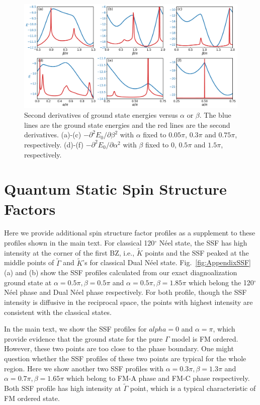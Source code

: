 \documentclass[aps,prb,reprint,amsfonts,amsmath,amssymb,showpacs,groupedaddress,superscriptaddress]{revtex4-1}
\begin{document}
\begin{figure}
    \centering
    \includegraphics[width=\columnwidth]{fig/SecondDerivatives.pdf}
    \caption{\label{fig:SecondDerivatives}Second derivatives of ground state energies versus $\alpha$ or $\beta$. The blue lines are the ground state energies and the red lines are the second derivatives. (a)-(c) $-\partial^2E_0/\partial\beta^2$ with $\alpha$ fixed to $0.05\pi$, $0.3\pi$ and $0.75\pi$, respectively. (d)-(f) $-\partial^2E_0/\partial\alpha^2$ with $\beta$ fixed to $0$, $0.5\pi$ and $1.5\pi$, respectively.}
\end{figure}

\section{\label{apx:SSF}Quantum Static Spin Structure Factors}

Here we provide additional spin structure factor profiles as a supplement to these profiles shown in the main text. For classical 120$^\circ$ N\'{e}el state, the SSF has high intensity at the corner of the first BZ, i.e., $\tilde{K}$ points and the SSF peaked at the middle points of $\tilde{\Gamma}$ and $\tilde{K}$'s for classical Dual N\'{e}el state. Fig.~\ref{fig:AppendixSSF}(a) and (b) show the SSF profiles calculated from our exact diagnoalization ground state at $\alpha=0.5\pi, \beta=0.5\pi$ and $\alpha=0.5\pi, \beta=1.85\pi$ which belong the 120$^\circ$ N\'{e}el phase and Dual N\'{e}el phase respectively. For both profile, though the SSF intensity is diffusive in the reciprocal space, the points with highest intensity are consistent with the classical states.

In the main text, we show the SSF profiles for $alpha=0$ and $\alpha=\pi$, which provide evidence that the ground state for the pure $\Gamma$ model is FM ordered. However, these two points are too close to the phase boundary. One might question whether the SSF profiles of these two points are typical for the whole region. Here we show another two SSF profiles with $\alpha=0.3\pi, \beta=1.3\pi$ and $\alpha=0.7\pi, \beta=1.65\pi$ which belong to FM-A phase and FM-C phase respectively. Both SSF profile has high intensity at $\tilde{\Gamma}$ point, which is a typical characteristic of FM ordered state.
\end{document}
